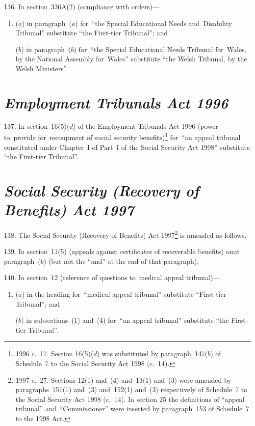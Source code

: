 \documentclass[12pt,a4paper]{article}
\begin{document}
\medskip

136.  In section~336A(2) (compliance with orders)—
\begin{enumerate}\item[]
($a$) in paragraph~($a$)  for~“the Special Educational Needs and~Disability Tribunal” substitute “the First-tier Tribunal”; and

($b$) in paragraph~($b$)  for~“the Special Educational Needs Tribunal for~Wales, by the National Assembly for~Wales” substitute “the Welsh Tribunal, by the Welsh Ministers”.
\end{enumerate}

\section*{\itshape Employment Tribunals Act 1996}

137.  In section~16(5)($d$)  of the Employment Tribunals Act 1996 (power to~provide for~recoupment of social security benefits)\footnote{1996 c.~17. Section 16(5)($d$) was substituted by paragraph~147($b$) of Schedule~7 to the Social Security Act 1998 (c.~14).} for~“an appeal tribunal constituted under Chapter~I of Part~I of the Social Security Act 1998” substitute “the First-tier Tribunal”.

\section*{\itshape\sloppy Social Security (Recovery of Benefits) Act 1997}

138.  The Social Security (Recovery of Benefits) Act 1997\footnote{1997 c.~27. Sections 12(1) and~(4) and~13(1) and~(3) were amended by paragraphs~151(1) and~(3) and~152(1) and~(3) respectively of Schedule~7 to the Social Security Act 1998 (c.~14). In section 25 the definitions of “appeal tribunal” and~“Commissioner” were inserted by paragraph~153 of Schedule~7 to the 1998 Act.} is amended as follows.

\medskip

139.  In section~11(5) (appeals against certificates of recoverable benefits) omit paragraph~($b$)  (but not the “and” at the end of that paragraph).

\medskip

140.  In section~12 (reference of questions to~medical appeal tribunal)—
\begin{enumerate}\item[]
($a$) in the heading for~“medical appeal tribunal” substitute “First-tier Tribunal”; and

($b$) in subsections~(1) and~(4) for~“an appeal tribunal” substitute “the First-tier Tribunal”.
\end{enumerate}
\end{document}
